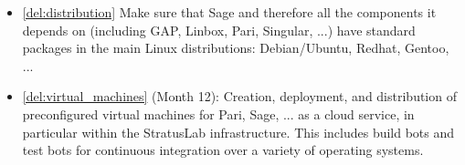 \begin{Workpackage}{\thewpno}
\begin{WPDeliverables}


    \begin{itemize}




    \item \ref{del:distribution} Make sure that Sage and therefore all the
      components it depends on (including GAP, Linbox, Pari, Singular,
      ...)  have standard packages in the main Linux distributions:
      Debian/Ubuntu, Redhat, Gentoo, ...


    \item \ref{del:virtual_machines} (Month 12): Creation, deployment, and
      distribution of preconfigured virtual machines for Pari, Sage,
      ... as a cloud service, in particular within the StratusLab
      infrastructure. This includes build bots and test bots for
      continuous integration over a variety of operating systems.


\end{itemize}
\end{WPDeliverables}
\end{Workpackage}
